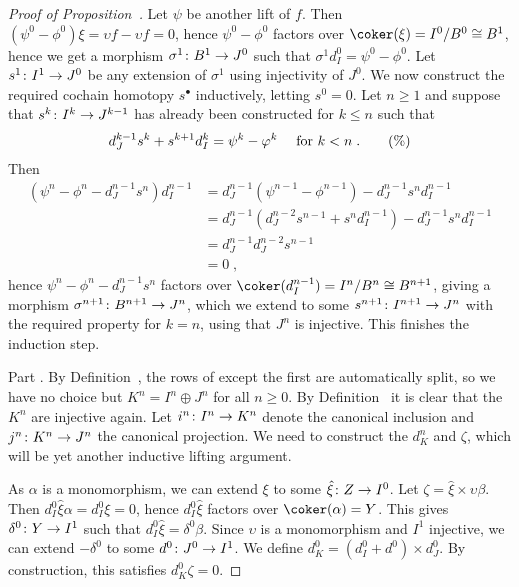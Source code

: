 \documentclass[a4paper,parskip=half,numbers=enddot, DIV=12]{scrreprt}
\renewcommand{\geq}{\geqslant}
\renewcommand{\leq}{\leqslant}
\begin{document}
\begin{proof}[Proof of Proposition~]
	Let $\psi $ be another lift of $f$. Then $(\psi^0-\phi^0)\xi=\upsilon f-\upsilon f=0$, hence $\psi^0-\phi^0$ factors over $\coker(\xi)=I^0/B^0\cong B^1$, hence we get a morphism $\sigma^1\colon B^1\morphism J^0$ such that $\sigma^1d_{I }^0=\psi^0-\phi^0$. Let $s^1\colon I^1\morphism J^0$ be any extension of $\sigma^1$ using injectivity of $J^0$. We now construct the required cochain homotopy $s^\bullet $ inductively, letting $s^0=0$. Let $n\geq 1$ and suppose that $s^k\colon I^k\morphism J^{k-1}$ has already been constructed for $k\leq n$ such that
	\begin{align}\lbl{eq:Horseshoe2}
		 d_{J }^{k-1}s^k+s^{k+1}d_{I }^k=\psi^k-\phi^k\quad\text{ for }k<n\;.\tag{\%}
	\end{align}
	Then
	\begin{align*}
		\left(\psi^n-\phi^n-d_{J }^{n-1}s^n\right)d_{I }^{n-1}&=d_{J }^{n-1}\left(\psi^{n-1}-\phi^{n-1}\right)-d_{J }^{n-1}s^nd_{I }^{n-1}\\
		&=d_{J }^{n-1}\left(d_{J }^{n-2}s^{n-1}+s^nd_{I }^{n-1}\right)-d_{J }^{n-1}s^nd_{I }^{n-1}\\
		&=d_{J }^{n-1}d_{J }^{n-2}s^{n-1}\\
		&=0\;,
	\end{align*}
	hence $\psi^n-\phi^n-d_{J }^{n-1}s^n$ factors over $\coker(d_{I }^{n-1})=I^n/B^n\cong B^{n+1}$, giving a morphism $\sigma^{n+1}\colon B^{n+1}\morphism J^n$, which we extend to some $s^{n+1}\colon I^{n+1}\morphism J^n$ with the required property  for $k=n$, using that $J^n$ is injective. This finishes the induction step.
	
	Part . By Definition~, the rows of  except the first are automatically split, so we have no choice but $K^n=I^n\oplus J^n$ for all $n\geq 0$. By Definition~ it is clear that the $K^n$ are injective again. Let $i^n\colon I^n\morphism K^n$ denote the canonical inclusion and $j^n\colon K^n\morphism J^n$ the canonical projection. We need to construct the $d_{K }^n$ and $\zeta$, which will be yet another inductive lifting argument.
	 
	 As $\alpha$ is a monomorphism, we can extend $\xi$ to some $\hat{\xi}\colon Z\morphism I^0$. Let $\zeta=\hat{\xi}\times \upsilon\beta$. Then $d_{I }^0\hat{\xi}\alpha=d_{I }^0\xi=0$, hence $d_{I }^0\hat{\xi}$ factors over $\coker(\alpha)=Y$. This gives $\delta^0\colon Y\morphism I^1$ such that $d_{I }^0\hat{\xi}=\delta^0\beta$. Since $\upsilon$ is a monomorphism and $I^1$ injective, we can extend $-\delta^0$ to some $d^0\colon J^0\morphism I^1$. We define $d_{K }^0=(d_{I }^0+d^0)\times d_{J }^0$. By construction, this satisfies $d_{K }^0\zeta=0$.
	 

\end{proof}
\end{document}
